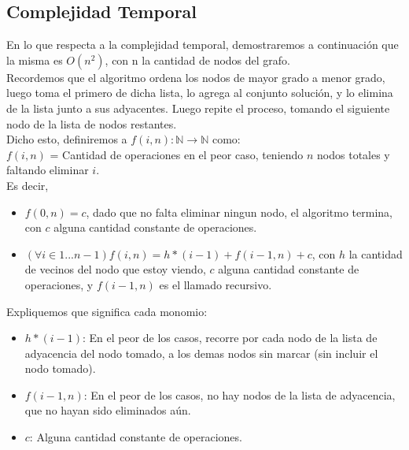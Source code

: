 
\newpage
\subsection{Complejidad Temporal}\label{compej3}
En lo que respecta a la complejidad temporal, demostraremos a continuación que la misma es $O(n^{2})$, con n la cantidad de nodos del grafo.\\

Recordemos que el algoritmo ordena los nodos de mayor grado a menor grado, luego toma el primero de dicha lista, lo agrega al conjunto solución, y lo elimina de la lista junto a sus adyacentes. Luego repite el proceso, tomando el siguiente nodo de la lista de nodos restantes.\\

Dicho esto, definiremos a $f(i,n): \mathbb{N} \rightarrow \mathbb{N}$ como:\\

$f(i,n)$ = Cantidad de operaciones en el peor caso, teniendo $n$ nodos totales y faltando eliminar $i$.\\

Es decir,\par

\begin{itemize}
	\item$f(0,n) = c$, dado que no falta eliminar ningun nodo, el algoritmo termina, con $c$ alguna cantidad constante de operaciones.\par
	\item $(\forall i \in {1...n-1}) f(i,n) = h*(i-1) + f(i-1,n) + c$, con $h$ la cantidad de vecinos del nodo que estoy viendo, $c$ alguna cantidad constante de operaciones, y $f(i-1,n)$ es el llamado recursivo.
\end{itemize}

Expliquemos que significa cada monomio:
\begin{itemize}
	\item $h*(i-1)$: En el peor de los casos, recorre por cada nodo de la lista de adyacencia del nodo tomado, a los demas nodos sin marcar (sin incluir el nodo tomado).
	\item $f(i-1,n)$: En el peor de los casos, no hay nodos de la lista de adyacencia, que no hayan sido eliminados aún.
	\item $c$: Alguna cantidad constante de operaciones.
\end{itemize}

